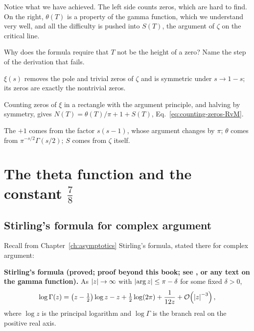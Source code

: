 Notice what we have achieved. The left side counts zeros, which are hard to find. On the right, $\theta(T)$ is a property of the gamma function, which we understand very well, and all the difficulty is pushed into $S(T)$, the argument of $\zeta$ on the critical line.

\begin{checkpoint}
Why does the formula require that $T$ not be the height of a zero? Name the step of the derivation that fails.
\end{checkpoint}

\begin{keyideas}
\item $\xi(s)$ removes the pole and trivial zeros of $\zeta$ and is symmetric under $s\to1-s$; its zeros are exactly the nontrivial zeros.
\item Counting zeros of $\xi$ in a rectangle with the argument principle, and halving by symmetry, gives $N(T)=\theta(T)/\pi+1+S(T)$, Eq.~\eqref{eq:counting-zeros-RvM}.
\item The $+1$ comes from the factor $s(s-1)$, whose argument changes by $\pi$; $\theta$ comes from $\pi^{-s/2}\Gamma(s/2)$; $S$ comes from $\zeta$ itself.
\end{keyideas}

\section{The theta function and the constant $\tfrac78$}\label{sec:counting-zeros-theta}

\subsection{Stirling's formula for complex argument}

Recall from Chapter~\ref{ch:asymptotics} Stirling's formula, stated there for complex argument:

\begin{beyond}
\textbf{Stirling's formula (proved; proof beyond this book; see \cite{rhb}, or any text on the gamma function).} As $\left\lvert z\right\rvert\to\infty$ with $\left\lvert \arg z\right\rvert\le\pi-\delta$ for some fixed $\delta>0$,
\begin{equation}
\log\Gamma(z)=\left(z-\tfrac12\right)\log z-z+\tfrac12\log(2\pi)+\frac{1}{12z}+\mathcal{O}\!\left(\left\lvert z\right\rvert^{-3}\right),
\label{eq:counting-zeros-stirling}
\end{equation}
where $\log z$ is the principal logarithm and $\log\Gamma$ is the branch real on the positive real axis.
\end{beyond}

